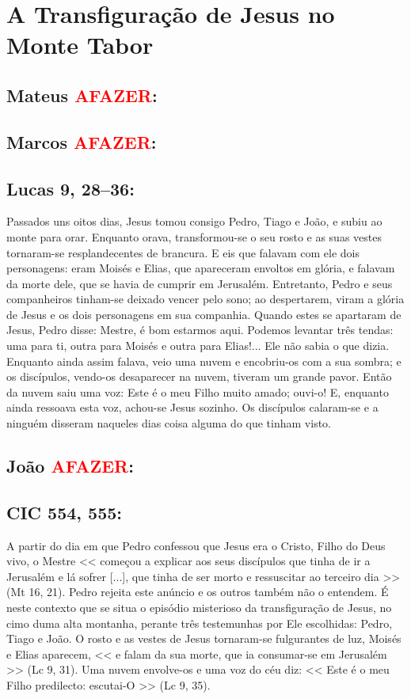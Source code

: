 \documentclass[10pt,a5paper]{book}
\newcommand{\from}[1]{\subsection*{#1}}
\newcommand{\TODO}{\textcolor{red}{\ttfamily AFAZER}}
\begin{document}

\section{A Transfiguração de Jesus no Monte Tabor}

\from{Mateus \TODO:}

\from{Marcos \TODO:}

\from{Lucas 9, 28--36:}

Passados uns oitos dias, Jesus tomou consigo Pedro, Tiago e João, e subiu ao monte para orar.
Enquanto orava, transformou-se o seu rosto e as suas vestes tornaram-se resplandecentes de brancura.
E eis que falavam com ele dois personagens:
eram Moisés e Elias,
que apareceram envoltos em glória, e falavam da morte dele, que se havia de cumprir em Jerusalém.
Entretanto, Pedro e seus companheiros tinham-se deixado vencer pelo sono;
ao despertarem, viram a glória de Jesus e os dois personagens em sua companhia.
Quando estes se apartaram de Jesus, Pedro disse:
Mestre, é bom estarmos aqui.
Podemos levantar três tendas:
uma para ti, outra para Moisés e outra para Elias!...
Ele não sabia o que dizia.
Enquanto ainda assim falava, veio uma nuvem e encobriu-os com a sua sombra;
e os discípulos, vendo-os desaparecer na nuvem, tiveram um grande pavor.
Então da nuvem saiu uma voz:
Este é o meu Filho muito amado;
ouvi-o!
E, enquanto ainda ressoava esta voz, achou-se Jesus sozinho.
Os discípulos calaram-se e a ninguém disseram naqueles dias coisa alguma do que tinham visto.

\from{João \TODO:}

\from{CIC 554, 555:}

A partir do dia em que Pedro confessou que Jesus era o Cristo, Filho do Deus vivo, o Mestre << começou a explicar aos seus discípulos que tinha de ir a Jerusalém e lá sofrer [...], que tinha de ser morto e ressuscitar ao terceiro dia >> (Mt 16, 21).
Pedro rejeita este anúncio e os outros também não o entendem.
É neste contexto que se situa o episódio misterioso da transfiguração de Jesus, no cimo duma alta montanha, perante três testemunhas por Ele escolhidas:
Pedro, Tiago e João.
O rosto e as vestes de Jesus tornaram-se fulgurantes de luz, Moisés e Elias aparecem, << e falam da sua morte, que ia consumar-se em Jerusalém >> (Lc 9, 31).
Uma nuvem envolve-os e uma voz do céu diz:
<< Este é o meu Filho predilecto: escutai-O >> (Lc 9, 35).
\end{document}
